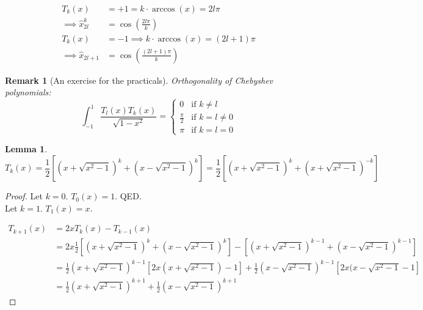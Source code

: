\documentclass{article}
\newtheorem*{remark}{Remark}
\newtheorem*{lemma}{Lemma}
\begin{document}
\begin{align*}
  T_k(x) &= +1 = k \cdot \arccos(x) = 2l\pi \\
  \implies \hat{x}_{2l}^k &= \cos\left(\frac{2l\pi}{k}\right) \\
  T_k(x) &= -1 \implies k \cdot \arccos(x) = (2l + 1) \pi \\
  \implies \hat{x}_{2l+1} &= \cos\left(\frac{(2l+1) \pi}{k}\right)
\end{align*}

\begin{remark}[An exercise for the practicals]
  Orthogonality of Chebyshev polynomials:
  \[
    \int_{-1}^1 \frac{T_l(x) T_k(x)}{\sqrt{1 - x^2}}
    = \begin{cases}
      0 & \text{if } k \neq l  \\
      \frac\pi2 & \text{if } k = l \neq 0 \\
      \pi & \text{if } k = l = 0
    \end{cases}
  \]
\end{remark}

\begin{lemma}
  \[
    T_k(x)
    = \frac12 \left[
      \left(x + \sqrt{x^2 - 1}\right)^k +
      \left(x - \sqrt{x^2 - 1}\right)^k
    \right]
    = \frac12 \left[
      (x + \sqrt{x^2 - 1})^k +
      (x + \sqrt{x^2 - 1})^{-k}
    \right]
  \]
\end{lemma}

\begin{proof}
  Let $k=0$. $T_0(x) = 1$. QED. \\
  Let $k=1$. $T_1(x) = x$.

  \begin{align*}
    T_{k+1}(x)
      &= 2x T_k(x) - T_{k-1}(x) \\
      &= 2x \frac12 \left[
        \left(x + \sqrt{x^2 - 1}\right)^k +
        \left(x - \sqrt{x^2 - 1}\right)^k
      \right] - \left[
        (x + \sqrt{x^2 - 1})^{k-1} +
        (x - \sqrt{x^2 - 1})^{k-1}
      \right] \\
      &= \frac12 \left(x + \sqrt{x^2 - 1}\right)^{k-1}
         \left[2x (x + \sqrt{x^2 - 1}) - 1\right]
       + \frac12 \left(x - \sqrt{x^2 - 1}\right)^{k-1}
         \left[2x (x - \sqrt{x^2 - 1} - 1\right] \\
      &= \frac12 \left(x + \sqrt{x^2 - 1}\right)^{k+1}
       + \frac12 \left(x - \sqrt{x^2 - 1}\right)^{k+1}
  \end{align*}
\end{proof}
\end{document}
